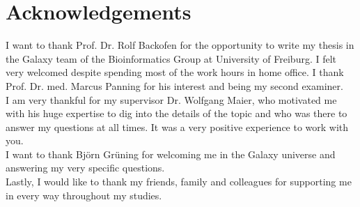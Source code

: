 \chapter*{Acknowledgements}
I want to thank Prof. Dr. Rolf Backofen for the opportunity to write my thesis in the Galaxy team of the Bioinformatics Group at University of Freiburg. I felt very welcomed despite spending most of the work hours in home office. I thank Prof. Dr. med. Marcus Panning for his interest and being my second examiner.\\
I am very thankful for my supervisor Dr. Wolfgang Maier, who motivated me with his huge expertise to dig into the details of the topic and who was there to answer my questions at all times. It was a very positive experience to work with you.\\
I want to thank Björn Grüning for welcoming me in the Galaxy universe and answering my very specific questions.\\
Lastly, I would like to thank my friends, family and colleagues for supporting me in every way throughout my studies.
